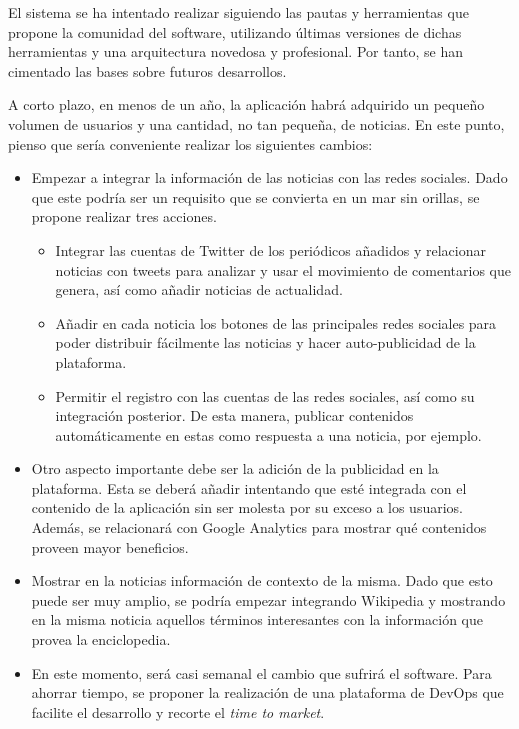 El sistema se ha intentado realizar siguiendo las pautas y herramientas que propone la comunidad del software, utilizando últimas versiones de dichas herramientas y una arquitectura novedosa y profesional. Por tanto, se han cimentado las bases sobre futuros desarrollos.

A corto plazo, en menos de un año, la aplicación habrá adquirido un pequeño volumen de usuarios y una cantidad, no tan pequeña, de noticias. En este punto, pienso que sería conveniente realizar los siguientes cambios:

\begin{itemize}
    \item Empezar a integrar la información de las noticias con las redes sociales. Dado que este podría ser un requisito que se convierta en un mar sin orillas, se propone realizar tres acciones.
    \begin{itemize}
        \item Integrar las cuentas de Twitter de los periódicos añadidos y relacionar noticias con tweets para analizar y usar el movimiento de comentarios que genera, así como añadir noticias de actualidad.
        \item Añadir en cada noticia los botones de las principales redes sociales para poder distribuir fácilmente las noticias y hacer auto-publicidad de la plataforma.
        \item Permitir el registro con las cuentas de las redes sociales, así como su integración posterior. De esta manera, publicar contenidos automáticamente en estas como respuesta a una noticia, por ejemplo.
    \end{itemize}
    \item Otro aspecto importante debe ser la adición de la publicidad en la plataforma. Esta se deberá añadir intentando que esté integrada con el contenido de la aplicación sin ser molesta por su exceso a los usuarios. Además, se relacionará con Google Analytics para mostrar qué contenidos proveen mayor beneficios.
    \item Mostrar en la noticias información de contexto de la misma. Dado que esto puede ser muy amplio, se podría empezar integrando Wikipedia y mostrando en la misma noticia aquellos términos interesantes con la información que provea la enciclopedia.
    \item En este momento, será casi semanal el cambio que sufrirá el software. Para ahorrar tiempo, se proponer la realización de una plataforma de DevOps que facilite el desarrollo y recorte el \textit{time to market}.
\end{itemize}

